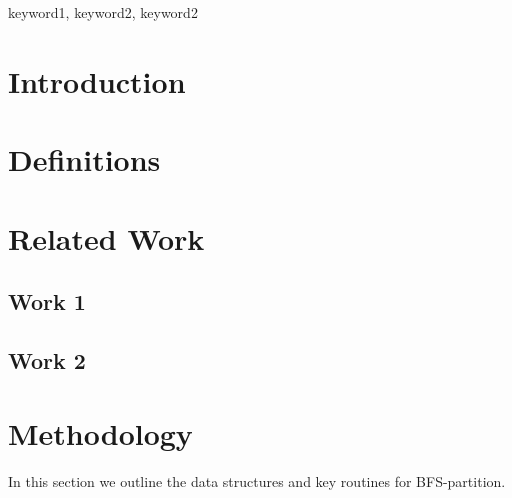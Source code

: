\documentclass[conference]{IEEEtran}
\begin{document}
\begin{IEEEkeywords}
keyword1, keyword2, keyword2
\end{IEEEkeywords}

\section{Introduction}
\lipsum[1-1]

\section{Definitions}
\lipsum[1-1]

\section{Related Work}

\subsection{Work 1}

\lipsum[1-1]
\cite{parmetis}

\subsection{Work 2}

\lipsum[1-1]

\section{Methodology}
In this section we outline the data structures and key routines for BFS-partition.
\end{document}
